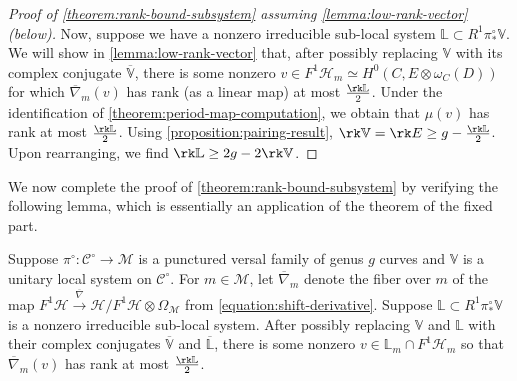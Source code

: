 \begin{proof}[Proof of \autoref{theorem:rank-bound-subsystem} assuming
	\autoref{lemma:low-rank-vector} (below)]
Now, suppose we have a nonzero irreducible sub-local system $\mathbb L \subset R^1 \pi^\circ_* \mathbb
V$.
We will show in \autoref{lemma:low-rank-vector} that, after possibly replacing $\mathbb{V}$ with its complex conjugate $\overline{\mathbb{V}}$, there is some nonzero $v \in
F^1\mathscr{H}_m \simeq
H^0(C, E \otimes \omega_C(D))$ for which
$\overline{\nabla}_m(v)$ has rank (as a linear map) at most $\frac{\rk \mathbb L}{2}$.
Under the identification of
\autoref{theorem:period-map-computation},
we obtain that $\mu(v)$ has rank at most $\frac{\rk \mathbb L}{2}$.
Using \autoref{proposition:pairing-result}, $\rk \mathbb{V}=\rk
E \geq g-\frac{\rk \mathbb L}{2}$. Upon rearranging, we find $\rk\mathbb{L}\geq 2g-2\rk\mathbb{V}$.
\end{proof}

We now complete the proof of \autoref{theorem:rank-bound-subsystem} by verifying
the following lemma, which is essentially an application of the theorem of the
fixed part.
\begin{lemma}
\notready\label{lemma:low-rank-vector}
Suppose $\pi^\circ:\mathscr{C}^\circ\to \mathscr{M}$ is a punctured versal family of genus
$g$ curves and $\mathbb{V}$ is a unitary local system on $\mathscr{C}^\circ$.
For $m \in \mathscr M$, let $\overline{\nabla}_m$ denote the fiber over $m$ of
the map $F^1\mathscr{H} \xrightarrow{\overline{\nabla}} \mathscr{H}/F^1
\mathscr{H} \otimes \Omega_{\mathscr M}$
from \eqref{equation:shift-derivative}.
Suppose
$\mathbb L \subset R^1 \pi^\circ_* \mathbb V$
is a nonzero irreducible sub-local system.
After possibly replacing $\mathbb{V}$ and $\mathbb L$ with their complex
conjugates
$\overline{\mathbb{V}}$ and $\overline{\mathbb L}$, there is some nonzero $v \in \mathbb L_m \cap F^1
\mathscr H_m$ so that
$\overline{\nabla}_m(v)$ has rank at most $\frac{\rk \mathbb L}{2}$.
\end{lemma}
